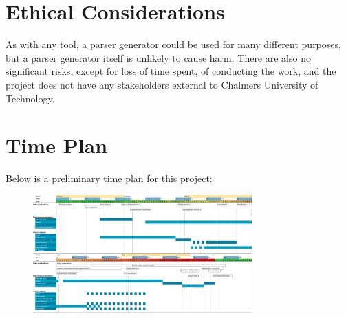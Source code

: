 \documentclass{article}
\begin{document}

\section{Ethical Considerations}
	
	As with any tool, a parser generator could be used for many different
	purposes, but a parser generator itself is unlikely to cause harm. There
	are also no significant risks, except for loss of time spent, of conducting
	the work, and the project does not have any stakeholders external to
	Chalmers University of Technology.

\section{Time Plan}
	
	Below is a preliminary time plan for this project:
	
	\begin{figure}
		\centering
		\includegraphics[angle=-90,width=0.75\textwidth]{gantt.png}
	\end{figure}

\newpage




\end{document}
